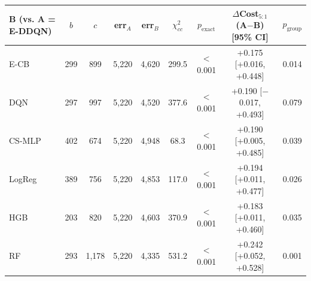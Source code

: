 \begin{tabular}{lcccccccc}
\toprule
B (vs. A = E-DDQN) & $b$ & $c$ & err$_A$ & err$_B$ & $\chi^2_{cc}$ & $p_{\text{exact}}$ & $\Delta$Cost$_{5:1}$ (A$-$B) [95\% CI] & $p_{\text{group}}$ \\
\midrule
E-CB & 299 & 899 & 5,220 & 4,620 & 299.5 & $<$0.001 & +0.175 [+0.016, +0.448] & 0.014 \\
DQN & 297 & 997 & 5,220 & 4,520 & 377.6 & $<$0.001 & +0.190 [$-$0.017, +0.493] & 0.079 \\
CS-MLP & 402 & 674 & 5,220 & 4,948 & 68.3 & $<$0.001 & +0.190 [+0.005, +0.485] & 0.039 \\
LogReg & 389 & 756 & 5,220 & 4,853 & 117.0 & $<$0.001 & +0.194 [+0.011, +0.477] & 0.026 \\
HGB & 203 & 820 & 5,220 & 4,603 & 370.9 & $<$0.001 & +0.183 [+0.011, +0.460] & 0.035 \\
RF & 293 & 1,178 & 5,220 & 4,335 & 531.2 & $<$0.001 & +0.242 [+0.052, +0.528] & 0.001 \\
\bottomrule
\end{tabular}
